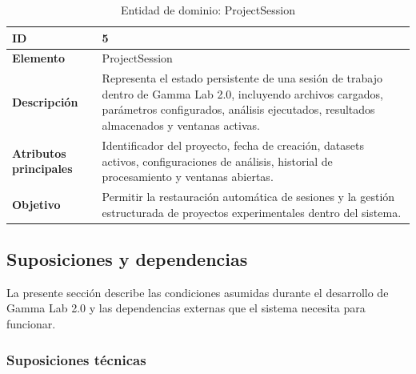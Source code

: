 \documentclass[12pt, letterpaper]{article}
\begin{document}
\begin{table}[H]
\centering

\begin{tabularx}{\textwidth}{|
>{}p{3.9cm}|
Y|
}

\hline
\textbf{ID} & 5 \\ \hline

\textbf{Elemento} & ProjectSession \\ \hline

\textbf{Descripción}
&
Representa el estado persistente de una sesión de trabajo dentro de Gamma
Lab 2.0, incluyendo archivos cargados, parámetros configurados, análisis
ejecutados, resultados almacenados y ventanas activas.
\\ \hline

\textbf{Atributos principales}
&
Identificador del proyecto, fecha de creación, datasets activos,
configuraciones de análisis, historial de procesamiento y ventanas
abiertas.
\\ \hline

\textbf{Objetivo}
&
Permitir la restauración automática de sesiones y la gestión estructurada
de proyectos experimentales dentro del sistema.
\\ \hline

\end{tabularx}

\caption{Entidad de dominio: ProjectSession}
\label{tab:projectsession}

\end{table}

\subsection{Suposiciones y dependencias}

La presente sección describe las condiciones asumidas durante el desarrollo
de Gamma Lab 2.0 y las dependencias externas que el sistema necesita
para funcionar.

\subsubsection{Suposiciones técnicas}
\end{document}
